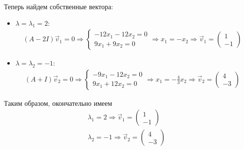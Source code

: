 \begin{solution}
    Теперь найдем собственные вектора:
    \begin{itemize}
        \item $\lambda = \lambda_1 = 2$:
        \begin{gather}
            (A-2 I)\vec{v}_1 = 0 \Longrightarrow 
            \begin{cases}
                -12x_1 - 12x_2 = 0 \\
                9x_1 + 9x_2 = 0
            \end{cases} \Longrightarrow x_1 = -x_2 \Longrightarrow \vec{v}_1 = 
            \begin{pmatrix}
                1 \\ -1
            \end{pmatrix}
        \end{gather}
        \item $\lambda = \lambda_2 = -1$:
        \begin{gather}
            (A + I)\vec{v}_2 = 0 \Longrightarrow 
            \begin{cases}
                -9x_1-12x_2 = 0\\
                9x_1+12x_2 = 0
            \end{cases} \Longrightarrow x_1 = -\frac43 x_2 \Longrightarrow \vec{v}_2 = 
            \begin{pmatrix}
                4 \\ -3
            \end{pmatrix}
        \end{gather}
    \end{itemize}
    Таким образом, окончательно имеем 
    \begin{gather}
        \lambda_1 = 2 \Longrightarrow \vec{v}_1 = 
        \begin{pmatrix}
            1 \\ -1
        \end{pmatrix} \\
        \lambda_2 = -1 \Longrightarrow \vec{v}_2 = 
        \begin{pmatrix}
            4 \\ -3
        \end{pmatrix}        
    \end{gather}


\end{solution}
